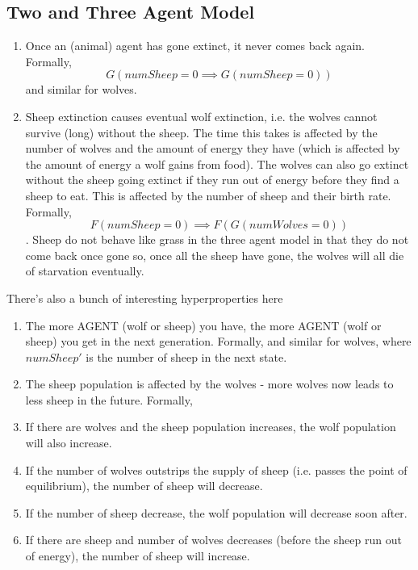 \documentclass{article}
\begin{document}
\subsection{Two and Three Agent Model}
\begin{enumerate}
  \item Once an (animal) agent has gone extinct, it never comes back again.
        Formally,
        $$G(numSheep = 0 \implies G(numSheep = 0))$$
        and similar for wolves.
  \item Sheep extinction causes eventual wolf extinction, i.e. the wolves cannot survive (long) without the sheep. The time this takes is affected by the number of wolves and the amount of energy they have (which is affected by the amount of energy a wolf gains from food). The wolves can also go extinct without the sheep going extinct if they run out of energy before they find a sheep to eat. This is affected by the number of sheep and their birth rate.
        Formally,
        $$F(numSheep = 0) \implies F(G(numWolves = 0))$$.
        Sheep do not behave like grass in the three agent model in that they do not come back once gone so, once all the sheep have gone, the wolves will all die of starvation eventually.
\end{enumerate}
There's also a bunch of interesting hyperproperties here
\begin{enumerate}
  \item The more AGENT (wolf or sheep) you have, the more AGENT (wolf or sheep) you get in the next generation.
        Formally,
        and similar for wolves, where $numSheep'$ is the number of sheep in the next state.
  \item The sheep population is affected by the wolves - more wolves now leads to less sheep in the future.
        Formally,
  \item If there are wolves and the sheep population increases, the wolf population will also increase.
  \item If the number of wolves outstrips the supply of sheep (i.e. passes the point of equilibrium), the number of sheep will decrease.
  \item If the number of sheep decrease, the wolf population will decrease soon after.
  \item If there are sheep and number of wolves decreases (before the sheep run out of energy), the number of sheep will increase.
\end{enumerate}
\end{document}
